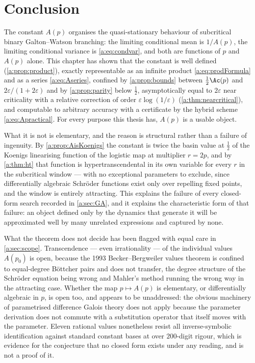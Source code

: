 \section{Conclusion}
\label{a:sec:conclusion}

The constant $A(p)$ organises the quasi-stationary behaviour of subcritical binary
Galton--Watson branching: the limiting conditional mean is $1/A(p)$, the limiting
conditional variance is \cref{a:eq:condvar}, and both are functions of $p$ and
$A(p)$ alone. This chapter has shown that the constant is well defined
(\cref{a:prop:product}), exactly representable as an infinite product
\cref{a:eq:prodFormula} and as a series \cref{a:eq:Aseries}, confined by
\cref{a:prop:bounds} between $\tfrac12\Ac(p)$ and $2\varepsilon/(1+2\varepsilon)$
and by \cref{a:prop:parity} below $\tfrac12$, asymptotically equal to $2\varepsilon$
near criticality with a relative correction of order $\varepsilon\log(1/\varepsilon)$
(\cref{a:thm:nearcritical}), and computable to arbitrary accuracy with a
certificate by the hybrid scheme \cref{a:eq:Apractical}. For every purpose this
thesis has, $A(p)$ is a usable object.

What it is not is elementary, and the reason is structural rather than a failure of
ingenuity. By \cref{a:prop:AisKoenigs} the constant is twice the basin value at
$\tfrac12$ of the Koenigs linearising function of the logistic map at multiplier
$r=2p$, and by \cref{a:thm:ht} that function is hypertranscendental in its own
variable for every $r$ in the subcritical window --- with no exceptional parameters
to exclude, since differentially algebraic Schröder functions exist only over
repelling fixed points, and the window is entirely attracting. This explains the
failure of every closed-form search recorded in \cref{a:sec:GA}, and it explains the
characteristic form of that failure: an object defined only by the dynamics that
generate it will be approximated well by many unrelated expressions and captured by
none.

What the theorem does not decide has been flagged with equal care in
\cref{a:sec:scope}. Transcendence --- even irrationality --- of the individual
values $A(p_0)$ is open, because the 1993 Becker--Bergweiler values theorem is
confined to equal-degree Böttcher pairs and does not transfer, the degree structure
of the Schröder equation being wrong and Mahler's method running the wrong way in
the attracting case. Whether the map $p\mapsto A(p)$ is elementary, or
differentially algebraic in $p$, is open too, and appears to be unaddressed: the
obvious machinery of parametrised difference Galois theory does not apply because
the parameter derivation does not commute with a substitution operator that itself
moves with the parameter. Eleven rational values nonetheless resist all
inverse-symbolic identification against standard constant bases at over $200$-digit
rigour, which is evidence for the conjecture that no closed form exists under any
reading, and is not a proof of it.

